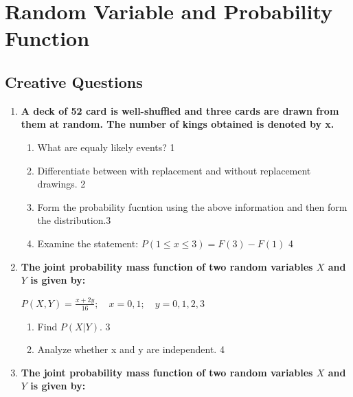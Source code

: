 \documentclass[a4paper,oneside]{book}
\begin{document}
\chapter{Random Variable and Probability Function}\label{sec:rv2}

\section{Creative Questions}

  \begin{enumerate}
  
 \item
	  \textbf{A deck of 52 card is well-shuffled and three cards are drawn from them at random. The number of kings obtained is denoted by x.} 
  
  \begin{enumerate}
    \item
	What are equaly likely events? \hfill 1
    \item
	Differentiate between with replacement and without replacement drawings. \hfill 2
    \item  
	Form the probability fucntion using the above information and then form the distribution.\hfill 3
    \item
	Examine the statement: $P(1 \le x \le 3) = F(3)-F(1)$ \hfill 4
  \end{enumerate}
  
  \item
  \textbf{The joint probability mass function of two random variables \( X \) and \( Y \) is given by:}
  
  \begin{center}
  \( \displaystyle P(X,Y) = \frac{x + 2y}{16}; \quad x = 0, 1; \quad y = 0, 1, 2, 3 \)
  \end{center}
 
  \begin{enumerate}
    \item
    	Find \( P(X | Y) \). \hfill 3
    \item
     	Analyze whether x and y are independent. \hfill 4
  \end{enumerate}  

  \item
  \textbf{The joint probability mass function of two random variables \( X \) and \( Y \) is given by:}
  

\end{enumerate}
\end{document}
